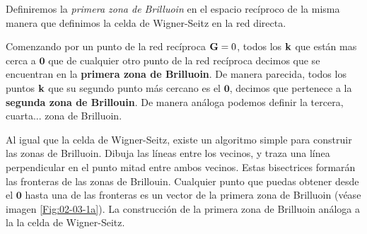 Definiremos la \textit{primera zona de Brilluoin} en el espacio recíproco de la misma manera que definimos la celda de Wigner-Seitz en la red directa. 

\begin{definition}
	Comenzando por un punto de la red recíproca $\mathbf{G}=0$, todos los $\mathbf{k}$ que están mas cerca a $\mathbf{0}$ que de cualquier otro punto de la red recíproca decimos que se encuentran en la \textbf{primera zona de Brilluoin}. De manera parecida, todos los puntos $\mathbf{k}$ que su segundo punto más cercano es el $\mathbf{0}$, decimos que pertenece a la \textbf{segunda zona de Brillouin}. De manera análoga podemos definir la tercera, cuarta... zona de Brilluoin. 
\end{definition}

Al igual que la celda de Wigner-Seitz, existe un algoritmo simple para construir las zonas de Brilluoin. Dibuja las líneas entre los vecinos, y traza una línea perpendicular en el punto mitad entre ambos vecinos. Estas bisectrices formarán las fronteras de las zonas de Brillouin. Cualquier punto que puedas obtener desde el $\mathbf{0}$ hasta una de las fronteras es un vector de la primera zona de Brilluoin (véase imagen \ref{Fig:02-03-1a}). La construcción de la primera zona de Brilluoin análoga a la la celda de Wigner-Seitz.

